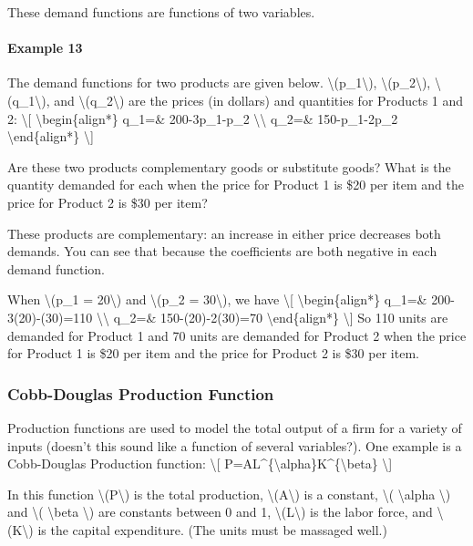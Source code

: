 These demand functions are functions of two variables.

\hypertarget{example-13}{%
\paragraph{Example 13}\label{example-13}}

The demand functions for two products are given below.
\textbackslash{}(p\_1\textbackslash{}),
\textbackslash{}(p\_2\textbackslash{}),
\textbackslash{}(q\_1\textbackslash{}), and
\textbackslash{}(q\_2\textbackslash{}) are the prices (in dollars) and
quantities for Products 1 and 2: \textbackslash{}{[}
\textbackslash{}begin\{align*\} q\_1=\& 200-3p\_1-p\_2
\textbackslash{}\textbackslash{} q\_2=\& 150-p\_1-2p\_2
\textbackslash{}end\{align*\} \textbackslash{}{]}

Are these two products complementary goods or substitute goods? What is
the quantity demanded for each when the price for Product 1 is \$20 per
item and the price for Product 2 is \$30 per item?

These products are complementary: an increase in either price decreases
both demands. You can see that because the coefficients are both
negative in each demand function.

When \textbackslash{}(p\_1 = 20\textbackslash{}) and
\textbackslash{}(p\_2 = 30\textbackslash{}), we have \textbackslash{}{[}
\textbackslash{}begin\{align*\} q\_1=\& 200-3(20)-(30)=110
\textbackslash{}\textbackslash{} q\_2=\& 150-(20)-2(30)=70
\textbackslash{}end\{align*\} \textbackslash{}{]} So 110 units are
demanded for Product 1 and 70 units are demanded for Product 2 when the
price for Product 1 is \$20 per item and the price for Product 2 is \$30
per item.

\hypertarget{cobb-douglas-production-function}{%
\subsubsection{Cobb-Douglas Production
Function}\label{cobb-douglas-production-function}}

Production functions are used to model the total output of a firm for a
variety of inputs (doesn't this sound like a function of several
variables?). One example is a Cobb-Douglas Production function:
\textbackslash{}{[}
P=AL\^{}\{\textbackslash{}alpha\}K\^{}\{\textbackslash{}beta\}
\textbackslash{}{]}

In this function \textbackslash{}(P\textbackslash{}) is the total
production, \textbackslash{}(A\textbackslash{}) is a constant,
\textbackslash{}( \textbackslash{}alpha \textbackslash{}) and
\textbackslash{}( \textbackslash{}beta \textbackslash{}) are constants
between 0 and 1, \textbackslash{}(L\textbackslash{}) is the labor force,
and \textbackslash{}(K\textbackslash{}) is the capital expenditure. (The
units must be massaged well.)

